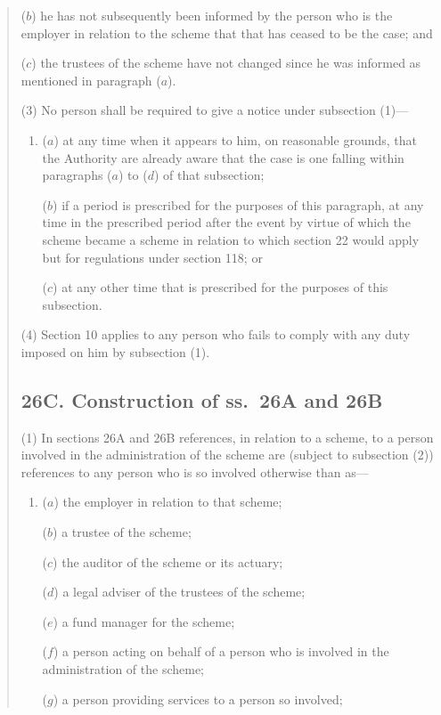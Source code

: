 \documentclass[12pt,a4paper]{article}
\begin{document}
\begin{quotation}
\begin{enumerate}
($b$) he has not subsequently been informed by the person who is the employer in relation to the scheme that that has ceased to be the case; and

($c$) the trustees of the scheme have not changed since he was informed as mentioned in paragraph ($a$).
\end{enumerate}

(3) No person shall be required to give a notice under subsection (1)—
\begin{enumerate}\item[]
($a$) at any time when it appears to him, on reasonable grounds, that the Authority are already aware that the case is one falling within paragraphs ($a$)  to ($d$)  of that subsection;

($b$) if a period is prescribed for the purposes of this paragraph, at any time in the prescribed period after the event by virtue of which the scheme became a scheme in relation to which section 22 would apply but for regulations under section 118; or

($c$) at any other time that is prescribed for the purposes of this subsection.
\end{enumerate}

(4) Section 10 applies to any person who fails to comply with any duty imposed on him by subsection (1).

\subsection*{26C. Construction of ss.\ 26A and 26B}

(1) In sections 26A and 26B references, in relation to a scheme, to a person involved in the administration of the scheme are (subject to subsection (2)) references to any person who is so involved otherwise than as—
\begin{enumerate}\item[]
($a$) the employer in relation to that scheme;

($b$) a trustee of the scheme;

($c$) the auditor of the scheme or its actuary;

($d$) a legal adviser of the trustees of the scheme;

($e$) a fund manager for the scheme;

($f$) a person acting on behalf of a person who is involved in the administration of the scheme;

($g$) a person providing services to a person so involved;


\end{enumerate}
\end{quotation}
\end{document}
